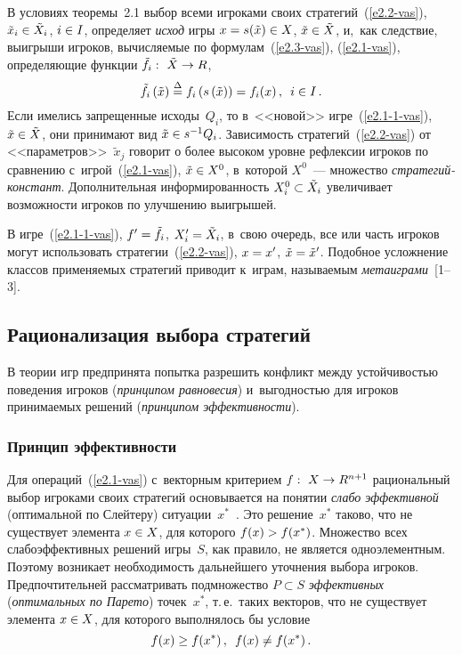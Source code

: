 \begin{multicols}{2}
    В условиях теоремы~2.1 выбор всеми игроками своих
    стратегий~(\ref{e2.2-vas}), $\tilde{x}_i\hm\in \tilde{X}_i$, $i\hm\in I$,
определяет \textit{исход} игры $x\hm= s(\tilde{x}) \hm\in X$, $\tilde{x}\hm\in
\tilde{X}$, и,~как следствие, выигрыши игроков, вычисляемые по
формулам~(\ref{e2.3-vas}), (\ref{e2.1-vas}), определяющие функции $\tilde{f}_i:\
\tilde{X}\hm\to R$,
    \begin{equation}
    \tilde{f}_i\left(\tilde{x}\right) \stackrel{\Delta}{=} f_i\left(s\left(\tilde{x}\right)\right)
=f_i(x)\,,\enskip i\in I\,.
    \label{e2.1-1-vas}
    \end{equation}
Если имелись запрещенные исходы~$Q_i$, то в~<<новой>>
игре~(\ref{e2.1-1-vas}), $\tilde{x}\hm\in \tilde{X}$, они принимают вид
$\tilde{x}\hm\in s^{-1} Q_i$. Зависимость стратегий~(\ref{e2.2-vas}) от
<<параметров>>~$\tilde{x}_j$ говорит о более высоком уровне рефлексии игроков
по сравнению с~игрой~(\ref{e2.1-vas}), $\tilde{x}\hm\in X^{0}$, в~которой $X^0$~---
множество \textit{стра\-те\-гий-констант}. Дополнительная информированность
$X_i^0\hm\subset \tilde{X}_i$ увеличивает возможности игроков по улучшению
выигрышей.

    В игре~(\ref{e2.1-1-vas}), $f^\prime \hm= \tilde{f}_i$, $X_i^\prime\hm=
\tilde{X}_i$, в~свою очередь, все или часть игроков могут использовать
стратегии~(\ref{e2.2-vas}), $x\hm= x^\prime$, $\tilde{x}\hm= \tilde{x}^\prime$.
Подобное усложнение классов применяемых стратегий приводит к~играм,
называемым \textit{метаиграми}~[1--3].

    \subsection{Рационализация выбора стратегий}

    В теории игр предпринята попытка разрешить конфликт между устойчивостью
поведения игроков (\textit{принципом равновесия}) и~выгодностью для игроков
принимаемых решений (\textit{принципом эффективности}).

    \subsubsection{Принцип эффективности }

    Для операций~(\ref{e2.1-vas}) с~векторным критерием $f:\ X\hm\to R^{n+1}$
рациональный выбор игроками своих стратегий основывается на понятии
\textit{слабо эффективной} (оптимальной по Слейтеру)
    ситуации~$x^*$~\cite{6-vas, 14-vas, 17-vas}. Это решение~$x^*$ таково, что не
существует элемента $x\hm\in X$, для которого $f(x)\hm> f(x^*)$. Множество всех
слабоэффективных решений игры~$S$, как правило, не является одноэлементным.
Поэтому возникает необходимость дальнейшего уточнения выбора игроков.
Предпочтительней рассматривать подмножество  $P\subset S$ \textit{эффективных}
(\textit{оптимальных по Парето}) точек~$x^*$, т.\,е.\ таких векторов, что не
существует элемента $x\hm\in X$, для которого выполнялось бы условие
$$
f(x)\geq f(x^*)\,,\enskip f(x)\not= f(x^*)\,.
$$


\end{multicols}
